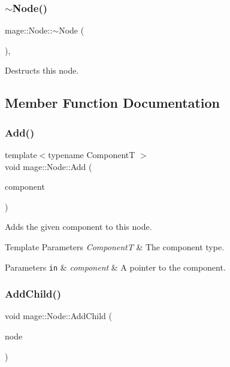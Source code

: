 \subsubsection{\texorpdfstring{$\sim$\+Node()}{~Node()}}
{\footnotesize\ttfamily mage\+::\+Node\+::$\sim$\+Node (\begin{DoxyParamCaption}{ }\end{DoxyParamCaption})\hspace{0.3cm}{\ttfamily [virtual]}, {\ttfamily [default]}}

Destructs this node. 

\subsection{Member Function Documentation}
\mbox{\label{classmage_1_1_node_a58452a6195ebea7a1a7a26f9a4dd8102}} 
\subsubsection{\texorpdfstring{Add()}{Add()}}
{\footnotesize\ttfamily template$<$typename ComponentT $>$ \\
void mage\+::\+Node\+::\+Add (\begin{DoxyParamCaption}\item[{\mbox{\hyperlink{classmage_1_1_proxy_ptr}{Proxy\+Ptr}}$<$ ComponentT $>$}]{component }\end{DoxyParamCaption})}

Adds the given component to this node.


\begin{DoxyTemplParams}{Template Parameters}
{\em ComponentT} & The component type. \\
\hline
\end{DoxyTemplParams}

\begin{DoxyParams}[1]{Parameters}
\mbox{\tt in}  & {\em component} & A pointer to the component. \\
\hline
\end{DoxyParams}
\mbox{\label{classmage_1_1_node_ad2324a1a111548e4b80b8e4cbaba5221}} 
\subsubsection{\texorpdfstring{Add\+Child()}{AddChild()}}
{\footnotesize\ttfamily void mage\+::\+Node\+::\+Add\+Child (\begin{DoxyParamCaption}\item[{\mbox{\hyperlink{classmage_1_1_node_ac575dc006e0ae1134277ade977dc06b6}{Node\+Ptr}}}]{node }\end{DoxyParamCaption})}

